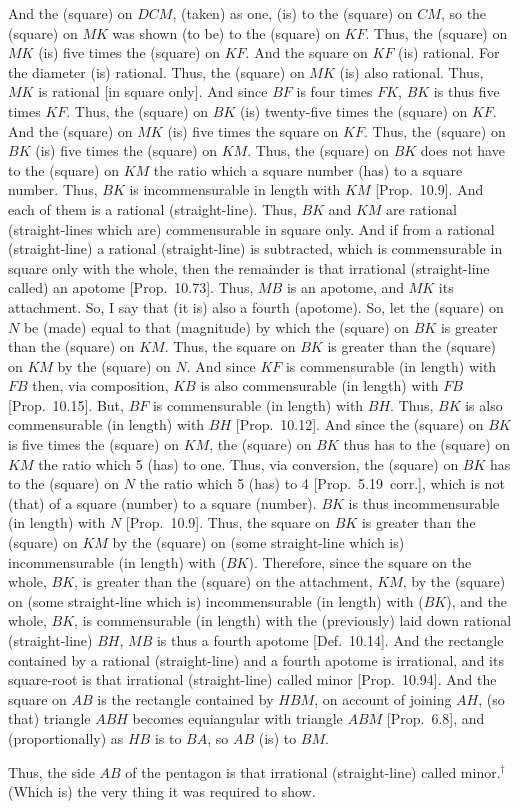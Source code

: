 \begin{Parallel}{}{}
{And the (square) on $DCM$, (taken) as one,  (is)  to the (square) on $CM$, so the (square) on $MK$ was shown (to be) to the (square) on 
$KF$.  Thus, the (square) on $MK$ (is) five times the (square) on 
$KF$. And the square on $KF$ (is) rational. For the diameter
(is) rational. Thus, the (square) on $MK$ (is) also rational. 
Thus, $MK$ is rational [in square only]. And since $BF$ is four times
$FK$, $BK$ is thus five times $KF$. Thus, the (square) on $BK$
(is) twenty-five times the (square) on $KF$.  And the (square) on $MK$
(is) five times the square on $KF$. Thus, the (square) on $BK$ (is) five
times the (square) on $KM$.  Thus, the (square) on $BK$ does not
have to the (square) on $KM$ the ratio which a square number (has) to
a square number. Thus, $BK$ is incommensurable in length with $KM$ [Prop.~10.9].
And each of them is a rational (straight-line).  Thus, $BK$ and $KM$ are rational
(straight-lines which are) commensurable in square only. And if from a rational (straight-line)
a rational (straight-line) is subtracted, which is commensurable in square
only with the whole, then the remainder is that irrational (straight-line
called) an apotome [Prop.~10.73]. Thus, $MB$ is an apotome, and $MK$ its attachment. So, I say that (it is) also a fourth (apotome). So, let the
(square) on $N$ be (made) equal to that (magnitude) by which the (square)
on $BK$ is greater than the (square) on $KM$. Thus, the
square on $BK$ is greater than the (square) on $KM$ by the (square) on $N$.
And since $KF$ is commensurable (in length) with $FB$ then, via composition, 
$KB$ is also commensurable (in length) with $FB$ [Prop.~10.15]. But, $BF$ is commensurable (in length)
with $BH$. Thus, $BK$ is also commensurable (in length) with $BH$ [Prop.~10.12]. And since the
(square) on $BK$ is five times the (square) on $KM$, the (square) on $BK$
thus has to the (square) on $KM$ the ratio which 5 (has) to one. Thus, via
conversion, the (square) on $BK$ has to the (square) on $N$ the ratio
which 5 (has) to 4 [Prop.~5.19~corr.], which is not (that) of a
square (number) to a square (number). $BK$ is thus incommensurable (in length)
with $N$ [Prop.~10.9]. Thus, the square on $BK$ is greater than
the (square) on $KM$ by the (square) on (some straight-line which is) incommensurable (in length) with ($BK$). Therefore, since the square on the whole,
$BK$, is greater than the (square) on the attachment, $KM$, by the
(square) on (some straight-line which is) incommensurable (in length) with ($BK$),
and the whole, $BK$, is commensurable (in length) with the (previously) laid down
rational (straight-line) $BH$, $MB$ is thus a fourth apotome
[Def.~10.14]. And the rectangle contained by a rational (straight-line)
and a fourth apotome is irrational, and its square-root is that irrational
(straight-line) called minor [Prop.~10.94]. And the square on $AB$
is the rectangle contained by $HBM$, on account of joining $AH$, (so that)
triangle $ABH$ becomes equiangular  with triangle $ABM$ [Prop.~6.8], and (proportionally) as
$HB$ is to $BA$, so $AB$ (is) to $BM$.

Thus, the side $AB$ of the pentagon is that irrational (straight-line)
called minor.$^\dag$ (Which is) the very thing it was required to show.}
\end{Parallel}
